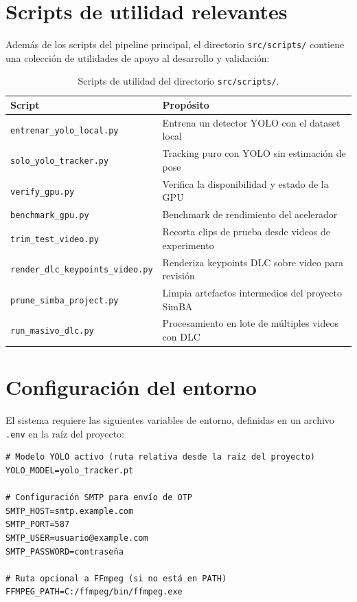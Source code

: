 \documentclass[12pt]{report}
\begin{document}
\section{Scripts de utilidad relevantes}

Además de los scripts del pipeline principal, el directorio \texttt{src/scripts/}
contiene una colección de utilidades de apoyo al desarrollo y validación:

\begin{table}[H]
    \centering
    \begin{tabular}{@{}lp{8.5cm}@{}}
        \toprule
        \textbf{Script} & \textbf{Propósito} \\
        \midrule
        \texttt{entrenar\_yolo\_local.py}      & Entrena un detector YOLO con el dataset local \\
        \texttt{solo\_yolo\_tracker.py}         & Tracking puro con YOLO sin estimación de pose \\
        \texttt{verify\_gpu.py}                & Verifica la disponibilidad y estado de la GPU \\
        \texttt{benchmark\_gpu.py}             & Benchmark de rendimiento del acelerador \\
        \texttt{trim\_test\_video.py}           & Recorta clips de prueba desde videos de experimento \\
        \texttt{render\_dlc\_keypoints\_video.py} & Renderiza keypoints DLC sobre video para revisión \\
        \texttt{prune\_simba\_project.py}       & Limpia artefactos intermedios del proyecto SimBA \\
        \texttt{run\_masivo\_dlc.py}            & Procesamiento en lote de múltiples videos con DLC \\
        \bottomrule
    \end{tabular}
    \caption{Scripts de utilidad del directorio \texttt{src/scripts/}.}
    \label{tab:scripts_util}
\end{table}

\section{Configuración del entorno}

El sistema requiere las siguientes variables de entorno, definidas en un
archivo \texttt{.env} en la raíz del proyecto:

\begin{lstlisting}[caption={Variables de entorno del sistema.}]
# Modelo YOLO activo (ruta relativa desde la raíz del proyecto)
YOLO_MODEL=yolo_tracker.pt

# Configuración SMTP para envío de OTP
SMTP_HOST=smtp.example.com
SMTP_PORT=587
SMTP_USER=usuario@example.com
SMTP_PASSWORD=contraseña

# Ruta opcional a FFmpeg (si no está en PATH)
FFMPEG_PATH=C:/ffmpeg/bin/ffmpeg.exe
\end{lstlisting}
\end{document}
